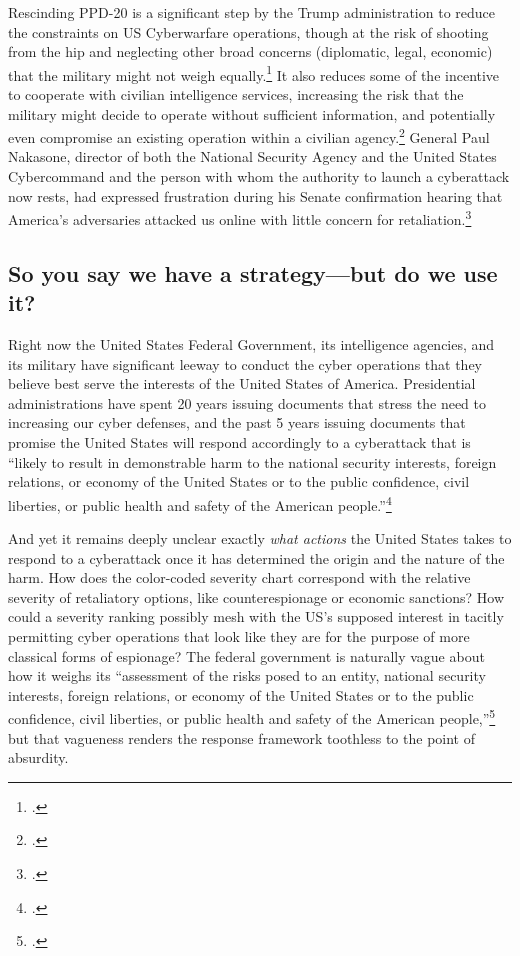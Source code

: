 \documentclass{report}
\begin{document}
\begin{refsegment}
Rescinding PPD-20 is a significant step by the Trump administration to reduce the constraints on US Cyberwarfare operations, though at the risk of shooting from the hip and neglecting other broad concerns (diplomatic, legal, economic) that the military might not weigh equally.\footcite{starks_ramifications_2018} It also reduces some of the incentive to cooperate with civilian intelligence services, increasing the risk that the military might decide to operate without sufficient information, and potentially even compromise an existing operation within a civilian agency.\footcite{hawkins_cybersecurity_2018} General Paul Nakasone, director of both the National Security Agency and the United States Cybercommand and the person with whom the authority to launch a cyberattack now rests, had expressed frustration during his Senate confirmation hearing that America's  adversaries attacked us online with little concern for retaliation.\footcite{sanger_trump_2018}

\subsection{So you say we have a strategy---but do we use it?}
Right now the United States Federal Government, its intelligence agencies, and its military have significant leeway to conduct the cyber operations that they believe best serve the interests of the United States of America. Presidential administrations have spent 20 years issuing documents that stress the need to increasing our cyber defenses, and the past 5 years issuing documents that promise the United States will respond accordingly to a cyberattack that is ``likely to result in demonstrable harm to the national security interests, foreign relations, or economy of the United States or to the public confidence, civil liberties, or public health and safety of the American people.''\footcite{office_of_the_press_secretary_fact_2016}

And yet it remains deeply unclear exactly \emph{what actions} the United States takes to respond to a cyberattack once it has determined the origin and the nature of the harm. How does the color-coded severity chart correspond with the relative severity of retaliatory options, like counterespionage or economic sanctions? How could a severity ranking possibly mesh with the US's supposed interest in tacitly permitting cyber operations that look like they are for the purpose of more classical forms of espionage? The federal government is naturally vague about how it weighs its ``assessment of the risks posed to an entity, national security interests, foreign relations, or economy of the United States or to the public confidence, civil liberties, or public health and safety of the American people,''\footcite{office_of_the_press_secretary_fact_2016} but that vagueness renders the response framework toothless to the point of absurdity.


\end{refsegment}
\end{document}
